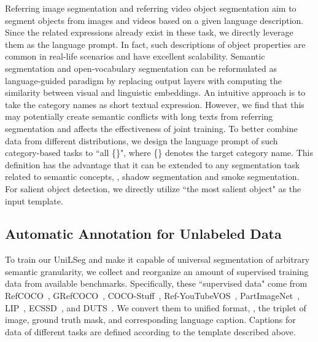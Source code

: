 \documentclass[10pt,twocolumn,letterpaper]{article}
\newcommand{\MethodName}{UniLSeg\xspace}
\begin{document}
Referring image segmentation and referring video object segmentation aim to segment objects from images and videos based on a given language description. Since the related expressions already exist in these task, we directly leverage them as the language prompt. In fact, such descriptions of object properties are common in real-life scenarios and have excellent scalability. 
Semantic segmentation and open-vocabulary segmentation can be reformulated as language-guided paradigm by replacing output layers with computing the similarity between visual and linguistic embeddings. An intuitive approach is to take the category names as short textual expression. However, we find that this may potentially create semantic conflicts with long texts from referring segmentation and affects the effectiveness of joint training. To better combine data from different distributions, we design the language prompt of such category-based tasks to ``all \{\}", where \{\} denotes the target category name. This definition has the advantage  that it can be extended to any segmentation task related to semantic concepts, \eg, shadow segmentation and smoke segmentation. For salient object detection, we directly utilize ``the most salient object" as the input template.







\subsection{Automatic Annotation for Unlabeled Data}
To train our \MethodName and make it capable of universal segmentation of arbitrary semantic granularity, we collect and reorganize an amount of supervised training data from available benchmarks. 
Specifically, these ``supervised data" come from RefCOCO~\cite{refcoco}, GRefCOCO~\cite{gres}, COCO-Stuff~\cite{coco}, Ref-YouTubeVOS~\cite{urvos}, PartImageNet~\cite{partimagenet}, LIP~\cite{lip}, ECSSD~\cite{ECSSD}, and DUTS~\cite{duts-tr}. 
We convert them to unified format, \ie, the triplet of image, ground truth mask, and corresponding language caption. Captions for data of different tasks are defined according to the template described above.
\end{document}
